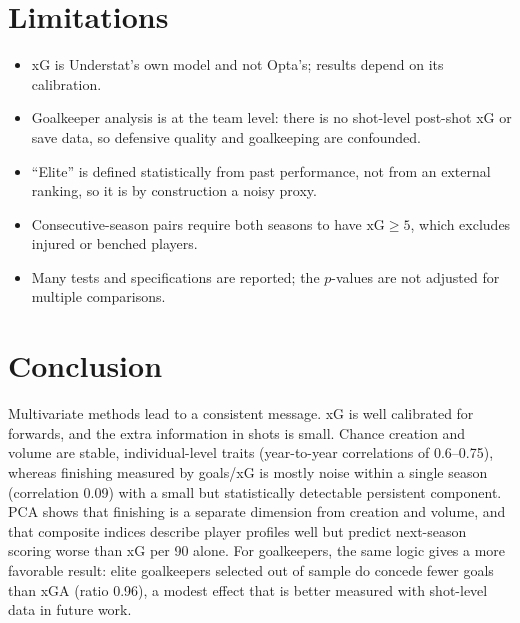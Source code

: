 \documentclass[11pt,a4paper]{article}
\begin{document}
\section{Limitations}

\begin{itemize}
\item xG is Understat's own model and not Opta's; results depend on its calibration.
\item Goalkeeper analysis is at the team level: there is no shot-level post-shot xG or save data, so defensive quality and goalkeeping are confounded.
\item ``Elite'' is defined statistically from past performance, not from an external ranking, so it is by construction a noisy proxy.
\item Consecutive-season pairs require both seasons to have $\text{xG}\geq 5$, which excludes injured or benched players.
\item Many tests and specifications are reported; the $p$-values are not adjusted for multiple comparisons.
\end{itemize}

\section{Conclusion}

Multivariate methods lead to a consistent message. xG is well calibrated for forwards, and the extra information in shots is small. Chance creation and volume are stable, individual-level traits (year-to-year correlations of 0.6--0.75), whereas finishing measured by goals/xG is mostly noise within a single season (correlation 0.09) with a small but statistically detectable persistent component. PCA shows that finishing is a separate dimension from creation and volume, and that composite indices describe player profiles well but predict next-season scoring worse than xG per 90 alone. For goalkeepers, the same logic gives a more favorable result: elite goalkeepers selected out of sample do concede fewer goals than xGA (ratio 0.96), a modest effect that is better measured with shot-level data in future work.
\end{document}
